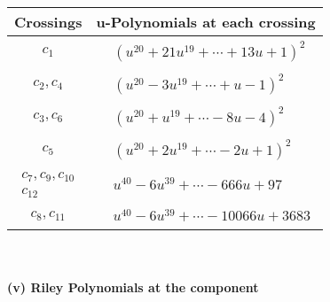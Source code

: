 \documentclass[1p]{elsarticle_modified}
\theoremstyle{definition}
\begin{document}
\begin{tabular}{m{50pt}|m{274pt}}
Crossings & \hspace{64pt}u-Polynomials at each crossing \\
\hline $$\begin{aligned}c_{1}\end{aligned}$$&$\begin{aligned}
&(u^{20}+21 u^{19}+\cdots+13 u+1)^{2}
\end{aligned}$\\
\hline $$\begin{aligned}c_{2},c_{4}\end{aligned}$$&$\begin{aligned}
&(u^{20}-3 u^{19}+\cdots+u-1)^{2}
\end{aligned}$\\
\hline $$\begin{aligned}c_{3},c_{6}\end{aligned}$$&$\begin{aligned}
&(u^{20}+u^{19}+\cdots-8 u-4)^{2}
\end{aligned}$\\
\hline $$\begin{aligned}c_{5}\end{aligned}$$&$\begin{aligned}
&(u^{20}+2 u^{19}+\cdots-2 u+1)^{2}
\end{aligned}$\\
\hline $$\begin{aligned}c_{7},c_{9},c_{10}\\c_{12}\end{aligned}$$&$\begin{aligned}
&u^{40}-6 u^{39}+\cdots-666 u+97
\end{aligned}$\\
\hline $$\begin{aligned}c_{8},c_{11}\end{aligned}$$&$\begin{aligned}
&u^{40}-6 u^{39}+\cdots-10066 u+3683
\end{aligned}$\\
\hline
\end{tabular}\\~\\
\newpage\renewcommand{\arraystretch}{1}
\flushleft \textbf{(v) Riley Polynomials at the component}\newline \\
\end{document}
